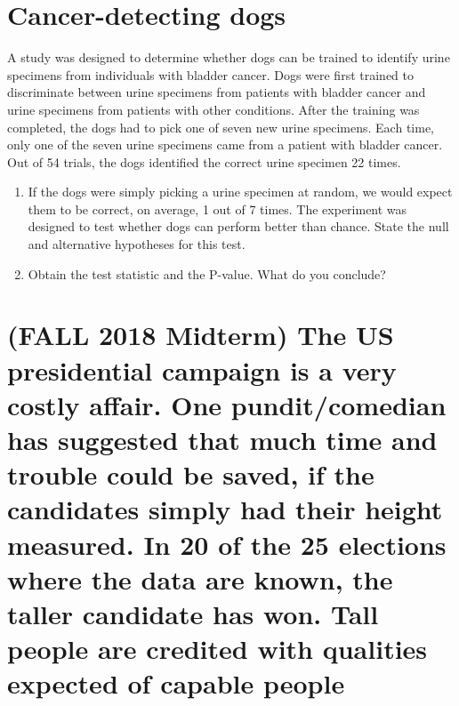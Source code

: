 \documentclass[letterpaper,11pt,twoside,]{pinp}
\providecommand{\tightlist}{%
  \setlength{\itemsep}{0pt}\setlength{\parskip}{0pt}}
\begin{document}
\hypertarget{cancer-detecting-dogs}{%
\section{Cancer-detecting dogs}\label{cancer-detecting-dogs}}

A study was designed to determine whether dogs can be trained to
identify urine specimens from individuals with bladder cancer. Dogs were
first trained to discriminate between urine specimens from patients with
bladder cancer and urine specimens from patients with other conditions.
After the training was completed, the dogs had to pick one of seven new
urine specimens. Each time, only one of the seven urine specimens came
from a patient with bladder cancer. Out of 54 trials, the dogs
identified the correct urine specimen 22 times.

\begin{enumerate}
\def\labelenumi{\alph{enumi}.}
\tightlist
\item
  If the dogs were simply picking a urine specimen at random, we would
  expect them to be correct, on average, 1 out of 7 times. The
  experiment was designed to test whether dogs can perform better than
  chance. State the null and alternative hypotheses for this test.
\item
  Obtain the test statistic and the P-value. What do you conclude?
\end{enumerate}

\hypertarget{fall-2018-midterm-the-us-presidential-campaign-is-a-very-costly-affair.-one-punditcomedian-has-suggested-that-much-time-and-trouble-could-be-saved-if-the-candidates-simply-had-their-height-measured.-in-20-of-the-25-elections-where-the-data-are-known-the-taller-candidate-has-won.-tall-people-are-credited-with-qualities-expected-of-capable-people}{%
\section{(FALL 2018 Midterm) The US presidential campaign is a very
costly affair. One pundit/comedian has suggested that much time and
trouble could be saved, if the candidates simply had their height
measured. In 20 of the 25 elections where the data are known, the taller
candidate has won. Tall people are credited with qualities expected of
capable
people}\label{fall-2018-midterm-the-us-presidential-campaign-is-a-very-costly-affair.-one-punditcomedian-has-suggested-that-much-time-and-trouble-could-be-saved-if-the-candidates-simply-had-their-height-measured.-in-20-of-the-25-elections-where-the-data-are-known-the-taller-candidate-has-won.-tall-people-are-credited-with-qualities-expected-of-capable-people}}
\end{document}
